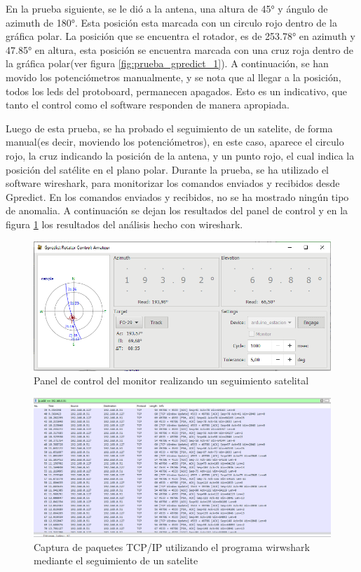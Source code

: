 En la prueba siguiente, se le dió a la antena, una altura de 45° y ángulo de azimuth de 180°. Esta posición esta marcada con un circulo rojo dentro de la gráfica polar. La posición que se encuentra el rotador, es de 253.78° en azimuth y 47.85° en altura, esta posición se encuentra marcada con una cruz roja dentro de la gráfica polar(ver figura \ref{fig:prueba_gpredict_1}). A continuación, se han movido los potenciómetros manualmente,  y se nota que al llegar a la posición, todos los leds del protoboard, permanecen apagados. Esto es un indicativo, que tanto el control como el software responden de manera apropiada. 

 
Luego de esta prueba, se ha probado el seguimiento de un satelite, de forma manual(es decir, moviendo los potenciómetros), en este caso, aparece el circulo rojo, la cruz indicando la posición de la antena, y un punto rojo, el cual indica la posición del satélite en el plano polar. Durante la prueba, se ha utilizado el software wireshark, para monitorizar los comandos enviados y recibidos desde Gpredict. En los comandos enviados y recibidos, no se ha mostrado ningún tipo de anomalia. A continuación se dejan los resultados del panel de control y en la figura \ref{fig:wireshark_gpr} los resultados del análisis hecho con wireshark. 


\begin{figure}[ht]
	\centering
	\includegraphics[scale=0.5]{gpredict_seguimiento_sat} 
	\caption{Panel de control del monitor realizando un seguimiento satelital} 
	
\end{figure}

\begin{figure}[ht]
	\includegraphics[scale=0.5]{wireshark_gpredict} 
	\caption{Captura de paquetes TCP/IP utilizando el programa wirwshark mediante el seguimiento de un satelite} 
	\label{fig:wireshark_gpr}
\end{figure}



